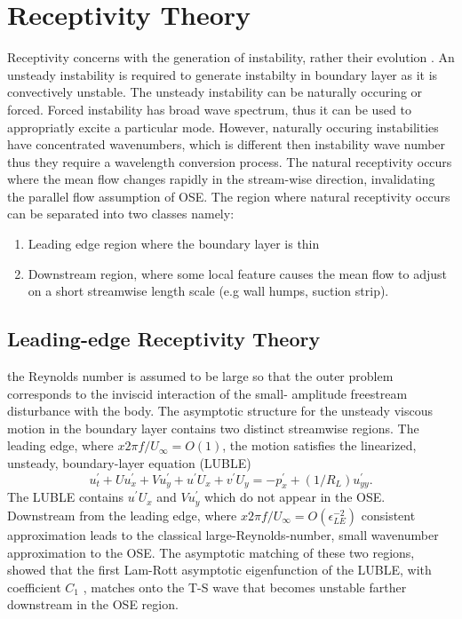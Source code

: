 \documentclass[twoside]{iitbreport}
\begin{document}
\section{Receptivity Theory}
Receptivity concerns with the generation of instability, rather their
evolution \cite{saric2002boundary}. An unsteady instability is required to
generate instabilty in
boundary layer as it is convectively unstable. The unsteady instability
can be naturally occuring or forced. Forced instability has broad wave
spectrum, thus it can be used to appropriatly excite a particular mode.
However, naturally occuring instabilities have concentrated wavenumbers,
which is different then instability wave number thus they require a
wavelength conversion process. The natural receptivity occurs where the mean
flow changes rapidly in the stream-wise direction, invalidating the
parallel flow assumption of OSE. The region where natural receptivity
occurs can be separated into two classes namely:
\begin{enumerate}
  \item Leading edge region where the boundary layer is thin
  \item Downstream region, where some local feature causes the mean flow to
    adjust on a short streamwise length scale (e.g wall humps, suction
    strip).
\end{enumerate}
\subsection{Leading-edge Receptivity Theory}
the Reynolds number is assumed to be large so that the outer problem
corresponds to the inviscid interaction of the small- amplitude freestream
disturbance with the body. The asymptotic structure for the unsteady viscous
motion in the boundary layer contains two distinct streamwise regions. The
leading edge, where $x2 \pi f /U_\infty = O(1)$, the motion satisfies the linearized,
unsteady, boundary-layer equation (LUBLE)
\begin{equation}
 u_{t}^{\prime}+U u_{x}^{\prime}+V u_{y}^{\prime}+u^{\prime}
 U_{x}+v^{\prime} U_{y}=-p_{x}^{\prime}+\left(1 / R_{L}\right) u_{y
 y}^{\prime}. 
  \label{eq:LUBLE}
\end{equation}
The LUBLE contains $u^{'} U_x$ and $V u^{'}_{y}$ which do not appear in
the OSE. Downstream from the leading edge, where $x2\pi f /U_\infty =
O(\epsilon_{LE}^{-2})$ consistent approximation leads to the classical
large-Reynolds-number, small wavenumber approximation to the OSE. The
asymptotic matching of these two regions, showed that the first
Lam-Rott asymptotic eigenfunction of the LUBLE, with coefficient $C_1$ ,
matches onto the T-S wave that becomes unstable farther downstream in the
OSE region.
\end{document}
